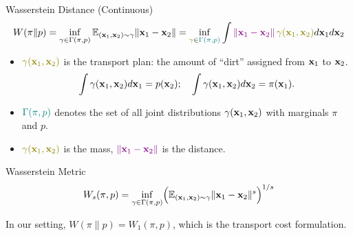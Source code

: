\documentclass{beamer}
\renewcommand{\eqpause}{}
\begin{document}
\begin{frame}{Wasserstein Distance (Continuous)}
	\vspace{-0.5cm}
	{
	\small
	\[
		W(\pi \| p) = \inf_{\gamma \in \Gamma(\pi, p)} \bbE_{(\bx_1, \bx_2) \sim \gamma} \| \bx_1 - \bx_2 \| =  \inf_{{\color{olive}\gamma} \in {\color{teal}\Gamma(\pi, p)}} \int {\color{violet} \| \bx_1 - \bx_2 \|}\, {\color{olive}\gamma (\bx_1, \bx_2)} d \bx_1 d \bx_2
	\]
	}
	\vspace{-0.4cm}
	\begin{itemize}
		\item ${\color{olive}\gamma (\bx_1, \bx_2)}$ is the transport plan: the amount of “dirt” assigned from $\mathbf{x}_1$ to $\mathbf{x}_2$.
		\vspace{-0.2cm}
		\[
		\int \gamma(\mathbf{x}_1, \mathbf{x}_2) d \mathbf{x}_1 = p(\mathbf{x}_2); \quad \int \gamma(\mathbf{x}_1, \mathbf{x}_2) d \mathbf{x}_2 = \pi(\mathbf{x}_1).
		\]
		\vspace{-0.6cm}
		\item ${\color{teal}\Gamma(\pi, p)}$ denotes the set of all joint distributions $\gamma (\mathbf{x}_1, \mathbf{x}_2)$ with marginals $\pi$ and $p$.
		\item ${\color{olive}\gamma(\bx_1, \bx_2)}$ is the mass, ${\color{violet}\|\mathbf{x}_1 - \mathbf{x}_2\|}$ is the distance.
	\end{itemize}
	\eqpause
	\begin{block}{Wasserstein Metric}
		\vspace{-0.2cm}
		\[
		W_s(\pi, p) = \inf_{\gamma \in \Gamma(\pi, p)} \Bigl(\mathbb{E}_{(\mathbf{x}_1, \mathbf{x}_2) \sim \gamma} \|\mathbf{x}_1 - \mathbf{x}_2\|^s\Bigr)^{1/s}
		\]
		\vspace{-0.4cm}
	\end{block}
	In our setting, $W(\pi \| p) = W_1(\pi, p)$, which is the transport cost formulation.
\end{frame}
\end{document}
